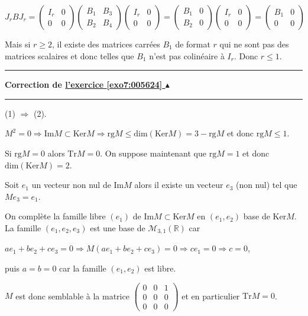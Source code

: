 \documentclass[11pt,a4paper]{article}
\newcommand{\Rr}{\mathbb{R}} \newcommand{\R}{\mathbb{R}}
\newcounter{exo}
\newcommand{\correction}[1]{\hypertarget{cor7:#1}{}\label{cor7:#1}{\bf Correction de \hyperlink{exo7:#1}{l'exercice \ref{exo7:#1} $\blacktriangle$}}\vspace{1mm}\hrule\vspace{1mm}}
\newcommand{\fincorrection}{\vspace{1mm}\hrule\vspace*{7mm}}
\begin{document}
\begin{center}
$J_rBJ_r=\left(
\begin{array}{cc}
I_r&0\\
0&0
\end{array}
\right)\left(
\begin{array}{cc}
B_1&B_3\\
B_2&B_4
\end{array}
\right)\left(
\begin{array}{cc}
I_r&0\\
0&0
\end{array}
\right)=\left(
\begin{array}{cc}
B_1&0\\
B_2&0
\end{array}
\right)\left(
\begin{array}{cc}
I_r&0\\
0&0
\end{array}
\right)=\left(
\begin{array}{cc}
B_1&0\\
0&0
\end{array}
\right)$
\end{center} 

Mais si $r\geqslant 2$, il existe des matrices carrées $B_1$ de format $r$ qui ne sont pas des matrices scalaires et donc telles que $B_1$ n'est pas colinéaire à $I_r$. Donc $r\leqslant 1$.
\fincorrection
\correction{005624}
(1) $\Rightarrow$ (2).

$M^2 = 0\Rightarrow\text{Im}M\subset\text{Ker}M\Rightarrow\text{rg}M\leqslant\text{dim}(\text{Ker}M)=3 -\text{rg}M$ et donc $\text{rg}M\leqslant1$.

Si $\text{rg}M=0$ alors $\text{Tr}M = 0$. On suppose maintenant que $\text{rg}M=1$ et donc $\text{dim}(\text{Ker}M)= 2$.

Soit $e_1$ un vecteur non nul de $\text{Im}M$ alors il existe un vecteur $e_3$ (non nul) tel que $Me_3 = e_1$.

On complète la famille libre $(e_1)$ de $\text{Im}M\subset\text{Ker}M$ en $(e_1,e_2)$ base de $\text{Ker}M$. La famille $(e_1,e_2,e_3)$ est une base de $\mathcal{M}_{3,1}(\Rr)$ car

\begin{center}
$ae_1+be_2+ce_3 = 0\Rightarrow M(ae_1+be_2+ce_3) = 0\Rightarrow ce_1 = 0\Rightarrow c = 0$,
\end{center}

puis $a = b = 0$ car la famille $(e_1,e_2)$ est libre.

$M$ est donc semblable à la matrice $\left(
\begin{array}{ccc}
0&0&1\\
0&0&0\\
0&0&0
\end{array}
\right)$ et en particulier $\text{Tr}M = 0$.
\end{document}
